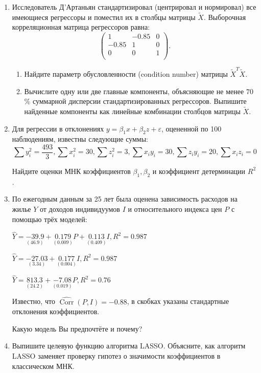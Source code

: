 \documentclass[12pt]{article}
\DeclareMathOperator{\Corr}{Corr}
\def \hY{\hat{Y}}
\def \hCorr{\widehat{\Corr}}
\begin{document}
\begin{enumerate}
\item
Исследователь Д'Артаньян стандартизировал (центрировал и нормировал) все
имеющиеся регрессоры и поместил их в столбцы матрицы $\tilde X$. Выборочная
корреляционная матрица регрессоров равна:
\[
\begin{pmatrix}
1 & -0.85 & 0  \\
-0.85 & 1 & 0  \\
0 & 0 & 1 \\
\end{pmatrix}.
\]
\begin{enumerate}
    \item Найдите параметр обусловленности (condition number) матрицы
    $\tilde X^T \tilde X$.
    \item Вычислите одну или две главные компоненты, объясняющие не менее
    $70$\% суммарной дисперсии стандартизированных регрессоров. Выпишите
    найденные компоненты как линейные комбинации столбцов матрицы $\tilde X$.
\end{enumerate}

\newpage



\item Для регрессии в отклонениях $y = \beta_1 x + \beta_2 z + \varepsilon$, оцененной по 100 наблюдениям, известны следующие суммы:
\[
\sum y^2_i = \frac{493}{3}, \sum x_i^2 = 30, \sum z_i^2 = 3, \sum x_i y_i = 30, \sum z_i y_i = 20, \sum x_i z_i = 0
\]

Найдите оценки МНК коэффициентов $\beta_1, \beta_2$ и коэффициент детерминации $R^2$.


\item По ежегодным данным за 25 лет была оценена зависимость расходов на жилье $Y$ от доходов индивидуумов $I$ и относительного индекса цен $P$ с помощью трёх моделей:

$\hY = \underset{(46.9)}{-39.9} + \underset{(0.009)}{0.179} P + \underset{(0.409)}{0.113} I, R^2 = 0.987$

$\hY = \underset{(3.34)}{-27.03} + \underset{(0.004)}{0.177} I, R^2 = 0.987$

$\hY = \underset{(24.2)}{813.3} + \underset{(0.019)}{-7.08} P, R^2 = 0.76$

Известно, что $\hCorr (P, I) = -0.88$, в скобках указаны стандартные отклонения коэффициентов.

Какую модель Вы предпочтёте и почему?

\item Выпишите целевую функцию алгоритма LASSO. Объясните, как алгоритм LASSO заменяет проверку гипотез
о значимости коэффициентов в классическом МНК.


\end{enumerate}
\end{document}
